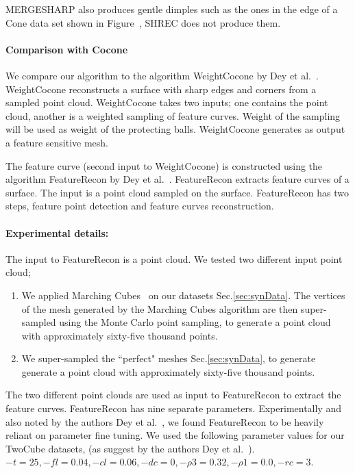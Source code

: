 MERGESHARP also produces gentle dimples such as the ones in the edge of a Cone data set shown in Figure~\protect{}, SHREC does not produce them. 	
\paragraph{Comparison with Cocone}
We compare our algorithm to the algorithm WeightCocone by Dey et al.~\cite{Dey2012}. WeightCocone reconstructs a surface with sharp edges and corners from a sampled point cloud. WeightCocone takes two inputs; one contains the point cloud, another is a weighted sampling of feature curves. Weight of the sampling will be used as weight of the protecting balls. WeightCocone generates as output a feature sensitive mesh. 

The feature curve (second input to WeightCocone) is constructed using the algorithm FeatureRecon by Dey et al.~\cite{Dey2013}. FeatureRecon extracts feature curves of a surface. The input is a point cloud sampled on the surface. FeatureRecon has two steps, feature point detection and feature curves reconstruction. 
\paragraph{Experimental details:} The input to FeatureRecon is a point cloud. We tested two different input point cloud;
\begin{enumerate}
	\item We applied Marching Cubes~\cite{lc-mchr3-87} on our datasets Sec.\ref{sec:synData}. The vertices of the mesh generated by the Marching Cubes algorithm are then super-sampled using the Monte Carlo point sampling, to generate a point cloud with approximately sixty-five thousand points.
	\item We super-sampled the ``perfect" meshes Sec.\ref{sec:synData}, to generate generate a point cloud with approximately sixty-five thousand points.
\end{enumerate}
The two different point clouds are used as input to FeatureRecon to extract the feature curves. 
FeatureRecon has nine separate parameters. Experimentally and also noted by the authors Dey et al.~\cite{Dey2013}, we found FeatureRecon to be heavily reliant on parameter fine tuning. We used the following parameter values for our TwoCube datasets, (as suggest by the authors Dey et al.~\cite{Dey2013}). 
$-t = 25,-fl = 0.04, -cl = 0.06, -dc = 0, -\rho3 = 0.32, -\rho1 = 0.0, -rc = 3$.

